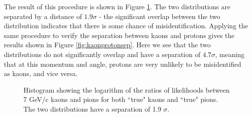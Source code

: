 The result of this procedure is shown in Figure \ref{fig:kaonpionsep}. The two distributions are separated by a distance of $1.9 \sigma$ - the significant overlap between the two distribution indicates that there is some chance of misidentification. Applying the same procedure to verify the separation between kaons and protons gives the results shown in Figure \ref{fig:kaonprotonsep}. Here we see that the two distributions do not significantly overlap and have a separation of $4.7 \sigma$, meaning that at this momentum and angle, protons are very unlikely to be misidentified as kaons, and vice versa.
\begin{figure}[]
\centering
{}
\caption[Particle identification separation for 7 GeV/c pions and kaons]{Histogram showing the logarithm of the ratios of likelihoods between 7 GeV/c kaons and pions for both ``true" kaons and ``true" pions. The two distributions have a separation of 1.9 $\sigma$.}
\label{fig:kaonpionsep} 
\end{figure}


